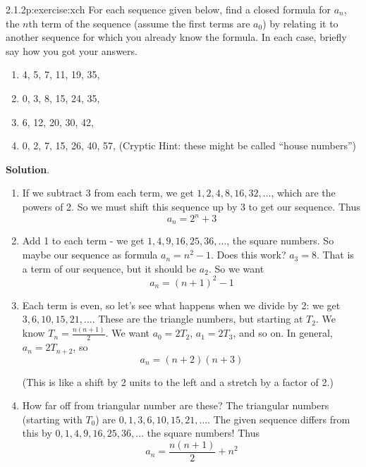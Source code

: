 \documentclass[twoside,11pt,]{book}
\newcommand{\blocktitlefont}{\relax}
\numberwithin{equation}{chapter}
\begin{document}
\begin{divisionsolution}{2.1.2}{}{p:exercise:xch}%
For each sequence given below, find a closed formula for \(a_n\), the \(n\)th term of the sequence (assume the first terms are \(a_0\)) by relating it to another sequence for which you already know the formula. In each case, briefly say how you got your answers.%
\begin{enumerate}[label=(\alph*)]
\item{}4, 5, 7, 11, 19, 35, \textellipsis{}%
\item{}0, 3, 8, 15, 24, 35, \textellipsis{}%
\item{}6, 12, 20, 30, 42, \textellipsis{}%
\item{}0, 2, 7, 15, 26, 40, 57, \textellipsis{} (Cryptic Hint: these might be called ``house numbers'')%
\end{enumerate}
%
\par\smallskip%
\noindent\textbf{\blocktitlefont Solution}.\quad{}%
\begin{enumerate}[label=(\alph*)]
\item{}If we subtract 3 from each term, we get \(1, 2, 4, 8, 16, 32, \ldots\), which are the powers of 2. So we must shift this sequence up by 3 to get our sequence. Thus%
\begin{equation*}
a_n = 2^n + 3
\end{equation*}
%
\item{}Add 1 to each term - we get \(1, 4, 9, 16, 25, 36, \ldots\), the square numbers. So maybe our sequence as formula \(a_n = n^2 - 1\). Does this work? \(a_3 = 8\). That is a term of our sequence, but it should be \(a_2\). So we want%
\begin{equation*}
a_n = (n+1)^2 - 1
\end{equation*}
%
\item{}Each term is even, so let's see what happens when we divide by 2: we get \(3, 6, 10, 15, 21,\ldots\). These are the triangle numbers, but starting at \(T_2\). We know \(T_n = \frac{n(n+1)}{2}\). We want \(a_0 = 2T_2\), \(a_1 = 2T_3\), and so on. In general, \(a_n = 2T_{n+2}\), so%
\begin{equation*}
a_n = (n+2)(n+3)
\end{equation*}
%
\par
(This is like a shift by 2 units to the left and a stretch by a factor of 2.)%
\item{}How far off from triangular number are these? The triangular numbers (starting with \(T_0\)) are \(0, 1, 3, 6, 10, 15, 21, \ldots\). The given sequence differs from this by \(0, 1, 4, 9, 16, 25, 36, \ldots\) the square numbers! Thus%
\begin{equation*}
a_n = \frac{n(n+1)}{2} + n^2
\end{equation*}
%
\end{enumerate}
%
\end{divisionsolution}%
\end{document}
